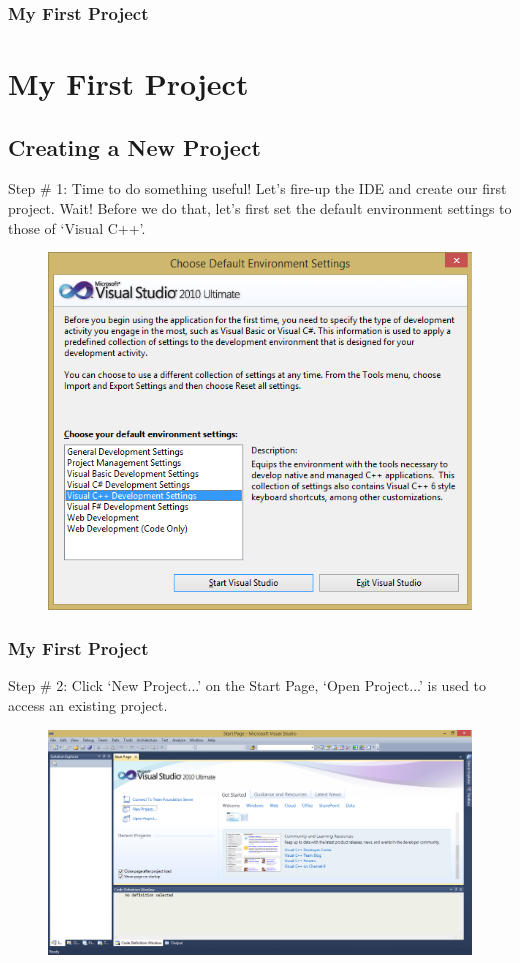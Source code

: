 \documentclass{beamer}
\begin{document}
\begin{frame}
    \frametitle{My First Project}
    \section{My First Project} %
    \label{sec:section_name}
    \subsection{Creating a New Project} %
    \label{sub:subsection_name}
    Step \# 1: Time to do something useful! Let's fire-up the IDE and create our first project. Wait! Before we do that, let's first set the default environment settings to those of `Visual C++'.
    \begin{figure}
        \centering
        \includegraphics[scale=0.35]{step_7}
    \end{figure}
\end{frame}

\begin{frame}
    \frametitle{My First Project}
    Step \# 2: Click `New Project...' on the Start Page, `Open Project...' is used to access an existing project.
    \begin{figure}
        \centering
        \includegraphics[scale=0.33]{step_8}
    \end{figure}
\end{frame}
\end{document}
